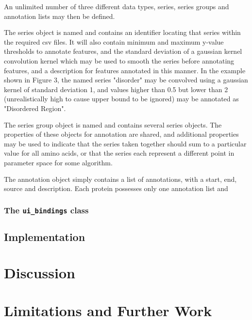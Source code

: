 \documentclass[fleqn,10pt]{article} %
\begin{document}
An unlimited number of three different data types, series, series groups and annotation lists may then be defined.


The series object is named and contains an identifier locating that series within the required csv files. It will also contain minimum and maximum y-value thresholds to annotate features, and the standard deviation of a gaussian kernel convolution kernel which may be used to smooth the series before annotating features, and a description for features annotated in this manner. In the example shown in Figure 3, the named series "disorder" may be convolved using a gaussian kernel of standard deviation 1, and values higher than 0.5 but lower than 2 (unrealistically high to cause upper bound to be ignored) may be annotated as "Disordered Region".


The series group object is named and contains several series objects. The properties of these objects for annotation are shared, and additional properties may be used to indicate that the series taken together should sum to a particular value for all amino acids, or that the series each represent a different point in parameter space for some algorithm.


The annotation object simply contains a list of annotations, with a start, end, source and description. Each protein possesses only one annotation list and 

\subsubsection{The \texttt{ui\_bindings} class}

\cite{Bostock2011}

\subsection{Implementation}

\section{Discussion}

\section{Limitations and Further Work}
\end{document}
